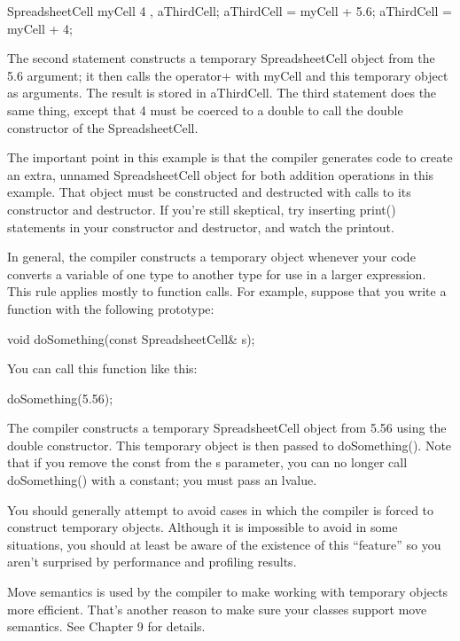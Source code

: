 \begin{cpp}
SpreadsheetCell myCell { 4 }, aThirdCell;
aThirdCell = myCell + 5.6;
aThirdCell = myCell + 4;
\end{cpp}

The second statement constructs a temporary SpreadsheetCell object from the 5.6 argument; it then calls the operator+ with myCell and this temporary object as arguments. The result is stored in aThirdCell. The third statement does the same thing, except that 4 must be coerced to a double to call the double constructor of the SpreadsheetCell.

The important point in this example is that the compiler generates code to create an extra, unnamed SpreadsheetCell object for both addition operations in this example. That object must be constructed and destructed with calls to its constructor and destructor. If you’re still skeptical, try inserting print() statements in your constructor and destructor, and watch the printout.

In general, the compiler constructs a temporary object whenever your code converts a variable of one type to another type for use in a larger expression. This rule applies mostly to function calls. For example, suppose that you write a function with the following prototype:

\begin{cpp}
void doSomething(const SpreadsheetCell& s);
\end{cpp}

You can call this function like this:

\begin{cpp}
doSomething(5.56);
\end{cpp}

The compiler constructs a temporary SpreadsheetCell object from 5.56 using the double constructor. This temporary object is then passed to doSomething(). Note that if you remove the const from the s parameter, you can no longer call doSomething() with a constant; you must pass an lvalue.

You should generally attempt to avoid cases in which the compiler is forced to construct temporary objects. Although it is impossible to avoid in some situations, you should at least be aware of the existence of this “feature” so you aren’t surprised by performance and profiling results.

Move semantics is used by the compiler to make working with temporary objects more efficient. That’s another reason to make sure your classes support move semantics. See Chapter 9 for details.

